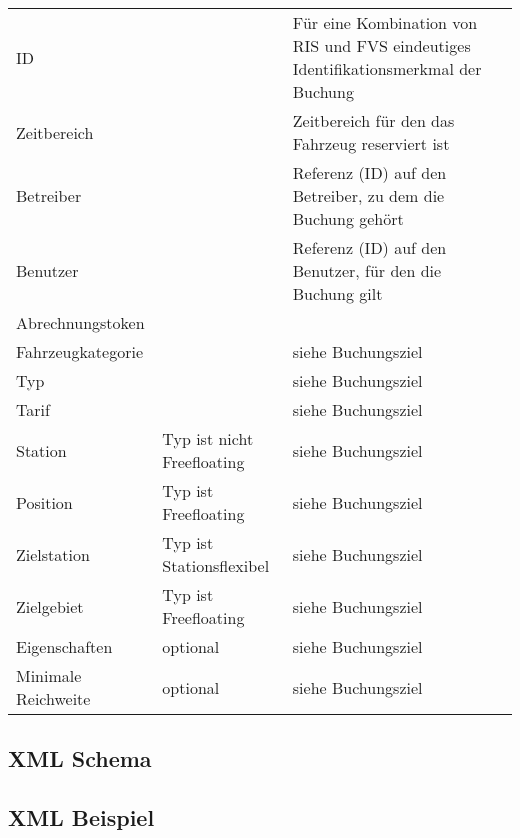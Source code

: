 \begin{flushleft}
\begin{tabularx}{\linewidth}{l>{\raggedright\arraybackslash}l>{\raggedright\arraybackslash}X} 
\toprule
ID & & Für eine Kombination von RIS und FVS eindeutiges Identifikationsmerkmal der Buchung \\
Zeitbereich & & Zeitbereich für den das Fahrzeug reserviert ist \\
Betreiber & & Referenz (ID) auf den Betreiber, zu dem die Buchung gehört \\
Benutzer & & Referenz (ID) auf den Benutzer, für den die Buchung gilt \\
Abrechnungstoken & & \\
Fahrzeugkategorie & & siehe Buchungsziel \\
Typ & & siehe Buchungsziel \\
Tarif & & siehe Buchungsziel \\
Station & Typ ist nicht Freefloating & siehe Buchungsziel \\
Position & Typ ist Freefloating & siehe Buchungsziel \\
Zielstation & Typ ist Stationsflexibel & siehe Buchungsziel \\
Zielgebiet & Typ ist Freefloating & siehe Buchungsziel \\
Eigenschaften & optional & siehe Buchungsziel \\
Minimale Reichweite & optional & siehe Buchungsziel \\
\bottomrule
\end{tabularx}
\end{flushleft}


\subsection{XML Schema}


\subsection{XML Beispiel}
